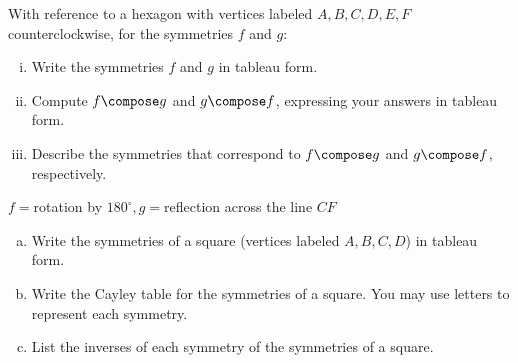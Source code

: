 \begin{exercise}{16}
With reference to a hexagon with vertices labeled $A,B,C,D,E,F$ counterclockwise, for the symmetries $f$ and $g$:
\begin{enumerate}[(i)]
\item
Write the symmetries $f$ and $g$ in tableau form.
\item
Compute $f \compose g$ and $g \compose f$, expressing your answers in tableau form.
\item 
Describe the symmetries that correspond to $f \compose g$ and $g \compose f$, respectively.
\end{enumerate}
\medskip
$f=$rotation by $ 180^\circ, g=$reflection across the line $CF$
\end{exercise}

\bigskip
\begin{exercise}{}
\begin{enumerate}[(a)]
\item
Write the symmetries of a square (vertices labeled $A,B,C,D$) in tableau form.
\item
Write the Cayley table for the symmetries of a square. You may use letters to represent each symmetry. 
\item
List the inverses of each symmetry of the symmetries of a square.
\end{enumerate}
\end{exercise}

